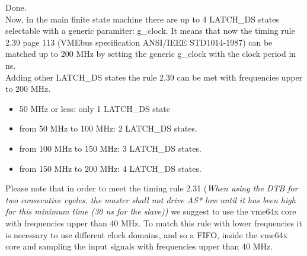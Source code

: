 \documentclass[a4paper,11pt]{article}
\begin{document}
\begin{itemize}
Done.\\
Now, in the main finite state machine there are up to 4 LATCH\_DS states selectable with a generic paramiter: g\_clock.
It means that now the timing rule 2.39 page 113 (VMEbus specification ANSI/IEEE STD1014-1987) can be matched up to 200 MHz by 
setting the generic g\_clock with the clock period in ns.\\
Adding other LATCH\_DS states the rule 2.39 can be met with frequencies upper to 200 MHz.\\
\begin{itemize}
\item 50 MHz or less: only 1 LATCH\_DS state
\item from 50 MHz to 100 MHz: 2 LATCH\_DS states.
\item from 100 MHz to 150 MHz: 3 LATCH\_DS states.
\item from 150 MHz to 200 MHz: 4 LATCH\_DS states.
\end{itemize}
Please note that in order to meet the timing rule 2.31 (\textit{When using the DTB for two consecutive cycles, the master shall 
not drive AS* low until it has been high for this minimum time (30 ns for the slave))} we suggest to use the vme64x core with 
frequencies upper than 40 MHz. To match this rule with lower frequencies it is necessary to use different clock domains, and so 
a FIFO, inside the vme64x core and sampling the input signals with frequencies upper than 40 MHz.

\end{itemize}
\newpage
\end{document}
